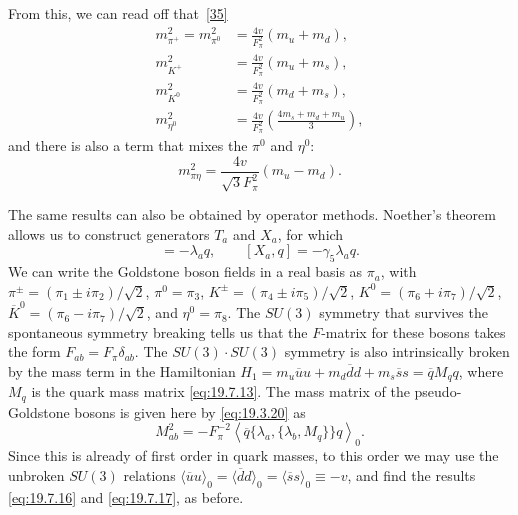 From this, we can read off that~\hyperref[ch19-ref-35]{[35]}
\begin{equation}
\begin{aligned}
m_{\pi^+}^2=m_{\pi^0}^2
&=\frac{4v}{F_\pi^2}(m_u+m_d),\\
m_{K^+}^2
&=\frac{4v}{F_\pi^2}(m_u+m_s),\\
m_{K^0}^2
&=\frac{4v}{F_\pi^2}(m_d+m_s),\\
m_{\eta^0}^2
&=\frac{4v}{F_\pi^2}
\left(\frac{4m_s+m_d+m_u}{3}\right),
\end{aligned}
\tag{19.7.16}\label{eq:19.7.16}
\end{equation}
and there is also a term that mixes the $\pi^0$ and $\eta^0$:
\begin{equation}
m_{\pi\eta}^2
=\frac{4v}{\sqrt3F_\pi^2}(m_u-m_d).
\tag{19.7.17}\label{eq:19.7.17}
\end{equation}

The same results can also be obtained by operator methods. Noether's theorem allows us to construct generators $T_a$ and $X_a$, for which
\begin{equation}
[T_a,q]=-\lambda_aq,
\qquad
[X_a,q]=-\gamma_5\lambda_aq.
\tag{19.7.18}\label{eq:19.7.18}
\end{equation}
We can write the Goldstone boson fields in a real basis as $\pi_a$, with $\pi^\pm=(\pi_1\pm i\pi_2)/\sqrt2$, $\pi^0=\pi_3$, $K^\pm=(\pi_4\pm i\pi_5)/\sqrt2$, $K^0=(\pi_6+i\pi_7)/\sqrt2$, $\overline K^0=(\pi_6-i\pi_7)/\sqrt2$, and $\eta^0=\pi_8$. The $SU(3)$ symmetry that survives the spontaneous symmetry breaking tells us that the $F$-matrix for these bosons takes the form $F_{ab}=F_\pi\delta_{ab}$. The $SU(3)\cdot SU(3)$ symmetry is also intrinsically broken by the mass term in the Hamiltonian $H_1=m_u\overline uu+m_d\overline dd+m_s\overline ss=\overline qM_qq$, where $M_q$ is the quark mass matrix \eqref{eq:19.7.13}. The mass matrix of the pseudo-Goldstone bosons is given here by \eqref{eq:19.3.20} as
\begin{equation}
M_{ab}^2
=-F_\pi^{-2}
\left\langle\overline q\{\lambda_a,\{\lambda_b,M_q\}\}q\right\rangle_0.
\tag{19.7.19}\label{eq:19.7.19}
\end{equation}
Since this is already of first order in quark masses, to this order we may use the unbroken $SU(3)$ relations $\langle\overline uu\rangle_0=\langle\overline dd\rangle_0=\langle\overline ss\rangle_0\equiv-v$, and find the results \eqref{eq:19.7.16} and \eqref{eq:19.7.17}, as before.

